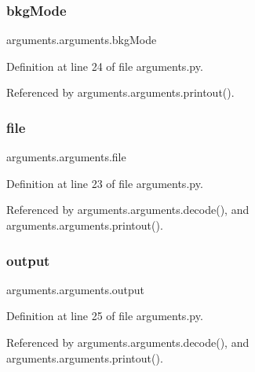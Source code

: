 \subsubsection{\texorpdfstring{bkg\+Mode}{bkgMode}}
{\footnotesize\ttfamily arguments.\+arguments.\+bkg\+Mode}



Definition at line 24 of file arguments.\+py.



Referenced by arguments.\+arguments.\+printout().

\mbox{\label{classarguments_1_1arguments_a95bc3c2f1cb1beb822d776e202131b4f}} 
\subsubsection{\texorpdfstring{file}{file}}
{\footnotesize\ttfamily arguments.\+arguments.\+file}



Definition at line 23 of file arguments.\+py.



Referenced by arguments.\+arguments.\+decode(), and arguments.\+arguments.\+printout().

\mbox{\label{classarguments_1_1arguments_aa3da800e3d6dbadd4cfa43fea9ad8d78}} 
\subsubsection{\texorpdfstring{output}{output}}
{\footnotesize\ttfamily arguments.\+arguments.\+output}



Definition at line 25 of file arguments.\+py.



Referenced by arguments.\+arguments.\+decode(), and arguments.\+arguments.\+printout().

\mbox{\label{classarguments_1_1arguments_a7eb3f133bfc7a375dd8c8dd6294504b6}} 
